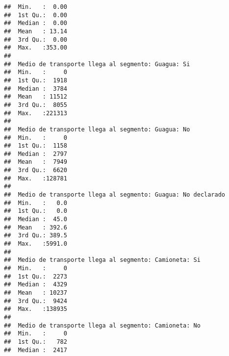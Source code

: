 \documentclass[11pt,]{article}
\begin{document}
\begin{verbatim}
##  Min.   :  0.00                                                                
##  1st Qu.:  0.00                                                                
##  Median :  0.00                                                                
##  Mean   : 13.14                                                                
##  3rd Qu.:  0.00                                                                
##  Max.   :353.00                                                                
##                                                                                
##  Medio de transporte llega al segmento: Guagua: Si
##  Min.   :     0                                   
##  1st Qu.:  1918                                   
##  Median :  3784                                   
##  Mean   : 11512                                   
##  3rd Qu.:  8055                                   
##  Max.   :221313                                   
##                                                   
##  Medio de transporte llega al segmento: Guagua: No
##  Min.   :     0                                   
##  1st Qu.:  1158                                   
##  Median :  2797                                   
##  Mean   :  7949                                   
##  3rd Qu.:  6620                                   
##  Max.   :128781                                   
##                                                   
##  Medio de transporte llega al segmento: Guagua: No declarado
##  Min.   :   0.0                                             
##  1st Qu.:   0.0                                             
##  Median :  45.0                                             
##  Mean   : 392.6                                             
##  3rd Qu.: 389.5                                             
##  Max.   :5991.0                                             
##                                                             
##  Medio de transporte llega al segmento: Camioneta: Si
##  Min.   :     0                                      
##  1st Qu.:  2273                                      
##  Median :  4329                                      
##  Mean   : 10237                                      
##  3rd Qu.:  9424                                      
##  Max.   :138935                                      
##                                                      
##  Medio de transporte llega al segmento: Camioneta: No
##  Min.   :     0                                      
##  1st Qu.:   782                                      
##  Median :  2417                                      

\end{verbatim}
\end{document}
